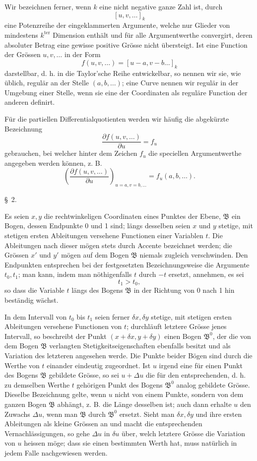 \documentclass[11pt,a4paper,leqno]{article}
\begin{document}
Wir bezeichnen ferner, wenn $k$ eine nicht negative ganze Zahl ist, durch
\[
 [u,v,\ldots]_k
\]
eine Potenzreihe der eingeklammerten Argumente, welche nur Glieder von mindestens $k^{\mathrm{ter}}$ Dimension enthält und für alle Argumentwerthe convergirt, deren absoluter Betrag eine gewisse positive Grösse nicht übersteigt. Ist eine Function der Grössen $u,v,\ldots$ in der Form
\[
 f(u,v,\ldots)=[u-a,v-b\ldots]_k
\]
darstellbar, d. h. in die Taylor'sche Reihe entwickelbar, so nennen wir sie, wie üblich, regulär an der Stelle $(a,b,\ldots)$; eine Curve nennen wir regulär in der Umgebung einer Stelle, wenn sie eine der Coordinaten als reguläre Function der anderen definirt.

Für die partiellen Differentialquotienten werden wir häufig die abgekürzte Bezeichnung
\[
 \frac{\partial f(u,v,\ldots)}{\partial u}=f_u
\]
gebrauchen, bei welcher hinter dem Zeichen $f_u$ die speciellen Argumentwerthe angegeben werden können, z. B.
\[
 \left(\frac{\partial f(u,v,\ldots)}{\partial u}\right)_{u=a,v=b,\ldots}=f_u(a,b,\ldots).
\]

\begin{center}{\large \S~2.}\end{center}

Es seien $x,y$ die rechtwinkeligen Coordinaten eines Punktes der Ebene, $\mathfrak{B}$ ein Bogen, dessen Endpunkte 0 und 1 sind; längs desselben seien $x$ und $y$ stetige, mit stetigen ersten Ableitungen versehene Functionen einer Variablen $t$. Die Ableitungen nach dieser mögen stets durch Accente bezeichnet werden; die Grössen $x'$ und $y'$ mögen auf dem Bogen $\mathfrak{B}$ niemals zugleich verschwinden. Den Endpunkten entsprechen bei der festgesetzten Bezeichnungsweise die Argumente $t_0,t_1$; man kann, indem man nöthigenfalls $t$ durch $-t$ ersetzt, annehmen, es sei
\[
 t_1>t_0,
\]
so dass die Variable $t$ längs des Bogens $\mathfrak{B}$ in der Richtung von 0 nach 1 hin beständig wächst.

In dem Intervall von $t_0$ bis $t_1$ seien ferner $\delta x,\delta y$ stetige, mit stetigen ersten Ableitungen versehene Functionen von $t$; durchläuft letztere Grösse jenes Intervall, so beschreibt der Punkt $(x+\delta x,y+\delta y)$ einen Bogen $\mathfrak{B}^0$, der die von dem Bogen $\mathfrak{B}$ verlangten Stetigkeitseigenschaften ebenfalls besitzt und als Variation des letzteren angesehen werde. Die Punkte beider Bögen sind durch die Werthe von $t$ einander eindeutig zugeordnet. Ist $u$ irgend eine für einen Punkt des Bogens $\mathfrak{B}$ gebildete Grösse, so sei $u+\Delta u$ die für den entsprechenden, d. h. zu demselben Werthe $t$ gehörigen Punkt des Bogens $\mathfrak{B}^0$ analog gebildete Grösse. Dieselbe Bezeichnung gelte, wenn $u$ nicht von einem Punkte, sondern von dem ganzen Bogen $\mathfrak{B}$ abhängt, z. B. die Länge desselben ist; auch dann erhalte $u$ den Zuwachs $\Delta u$, wenn man $\mathfrak{B}$ durch $\mathfrak{B}^0$ ersetzt. Sieht man $\delta x,\delta y$ und ihre ersten
Ableitungen als kleine Grössen an und macht die entsprechenden Vernachlässigungen, so gehe $\Delta u$ in $\delta u$ über, welch letztere Grösse die Variation von $u$ heissen möge; dass sie einen bestimmten Werth hat, muss natürlich in jedem Falle nachgewiesen werden.
\end{document}
